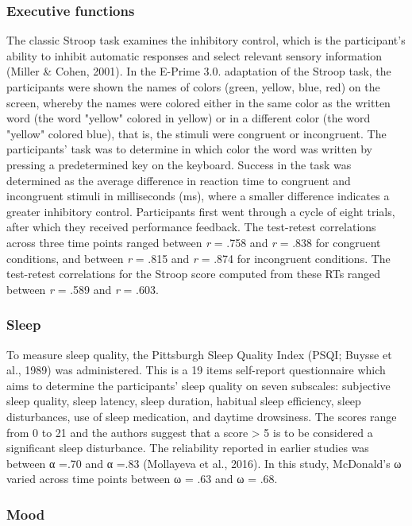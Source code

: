 \documentclass[authordate, empirical,issue]{jote-new-article}
\begin{document}
\subsubsection{Executive functions}
The classic Stroop task examines the inhibitory control, which is the participant's ability to inhibit automatic responses and select relevant sensory information (Miller \& Cohen, 2001). In the E-Prime 3.0. adaptation of the Stroop task, the participants were shown the names of colors (green, yellow, blue, red) on the screen, whereby the names were colored either in the same color as the written word (the word "yellow" colored in yellow) or in a different color (the word "yellow" colored blue), that is, the stimuli were congruent or incongruent. The participants' task was to determine in which color the word was written by pressing a predetermined key on the keyboard. Success in the task was determined as the average difference in reaction time to congruent and incongruent stimuli in milliseconds (ms), where a smaller difference indicates a greater inhibitory control. Participants first went through a cycle of eight trials, after which they received performance feedback. The test-retest correlations across three time points ranged between \emph{r} = .758 and \emph{r} = .838 for congruent conditions, and between \emph{r} = .815 and \emph{r} = .874 for incongruent conditions. The test-retest correlations for the Stroop score computed from these RTs ranged between \emph{r} = .589 and \emph{r} = .603.



\subsubsection{Sleep}

To measure sleep quality, the Pittsburgh Sleep Quality Index (PSQI; Buysse et al., 1989) was administered. This is a 19 items self-report questionnaire which aims to determine the participants' sleep quality on seven subscales: subjective sleep quality, sleep latency, sleep duration, habitual sleep efficiency, sleep disturbances, use of sleep medication, and daytime drowsiness. The scores range from 0 to 21 and the authors suggest that a score > 5 is to be considered a significant sleep disturbance. The reliability reported in earlier studies was between α =.70 and α =.83 (Mollayeva et al., 2016). In this study, McDonald's ω varied across time points between ω = .63 and ω = .68.


\subsubsection{Mood}
\end{document}
